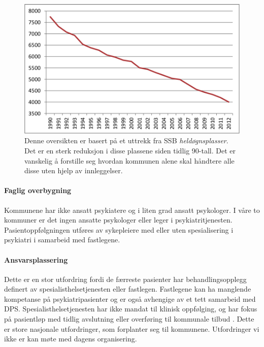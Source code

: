 \documentclass[11pt]{report} %
\begin{document}
                
                  \begin{figure}[ht]
                  \begin{mdframed}[style=mystyle]
                    \centering
                    \includegraphics[width=4.5in]{./pix/heldgnpsykplass}
                    \caption[Oversikt over reduksjon i \textit{heldøgnsplasser}.]
                     {Denne oversikten er basert på et uttrekk fra SSB \textit{heldøgnsplasser}. Det er en sterk reduksjon i disse plassene siden tidlig 90-tall. Det er vanskelig å forstille seg hvordan kommunen alene skal håndtere alle disse uten hjelp av innleggelser.}
                  \end{mdframed}
                  \end{figure}
             
                   \paragraph{Faglig overbygning\\}
                    Kommunene har ikke ansatt psykiatere og i liten grad ansatt psykologer. I våre to kommuner er det ingen ansatte psykologer eller leger i psykiatritjenesten. Pasientoppfølgningen utføres av sykepleiere med eller uten spesialisering i psykiatri i samarbeid med fastlegene.
                  \paragraph{Ansvarsplassering\\}
                    Dette er en stor utfordring fordi de færreste pasienter har behandlingsopplegg definert av spesialisthelsetjenesten eller fastlegen. Fastlegene kan ha manglende kompetanse på psykiatripasienter og er også avhengige av et tett samarbeid med DPS. Spesialisthelsetjenesten har ikke mandat til klinisk oppfølging, og har fokus på pasientløp med tidlig avslutning eller overføring til kommunale tilbud
                    \cite{HOTJL-12}.
                    Dette er store nasjonale utfordringer, som forplanter seg til kommunene. Utfordringer vi ikke er kan møte med dagens organisering. \\
\end{document}
